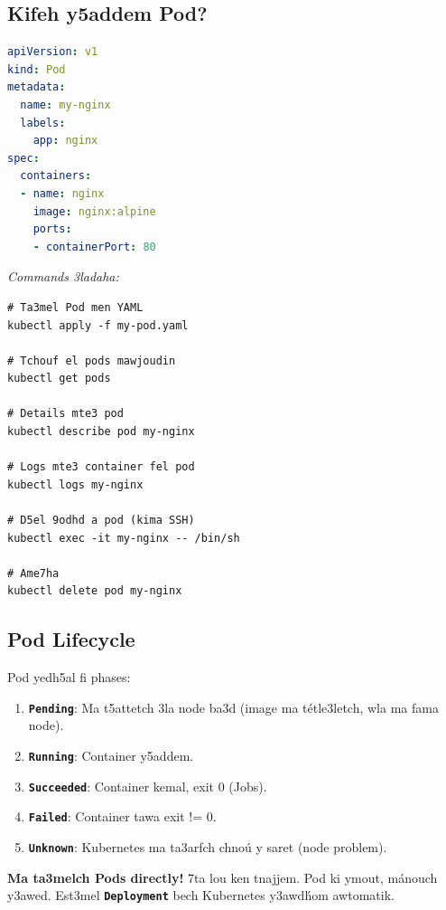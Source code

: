 \documentclass[11pt,a4paper]{book}
\newcommand{\tuni}[1]{\textit{\color{k8sdark}#1}}
\newcommand{\tech}[1]{\texttt{\color{k8sblue}\textbf{#1}}}
\begin{document}
\subsection{Kifeh y5addem Pod?}

\begin{lstlisting}[language=yaml,caption={Pod b\'essat}]
apiVersion: v1
kind: Pod
metadata:
  name: my-nginx
  labels:
    app: nginx
spec:
  containers:
  - name: nginx
    image: nginx:alpine
    ports:
    - containerPort: 80
\end{lstlisting}

\tuni{Commands 3ladaha:}
\begin{lstlisting}
# Ta3mel Pod men YAML
kubectl apply -f my-pod.yaml

# Tchouf el pods mawjoudin
kubectl get pods

# Details mte3 pod
kubectl describe pod my-nginx

# Logs mte3 container fel pod
kubectl logs my-nginx

# D5el 9odhd a pod (kima SSH)
kubectl exec -it my-nginx -- /bin/sh

# Ame7ha
kubectl delete pod my-nginx
\end{lstlisting}

\subsection{Pod Lifecycle}

Pod yedh5al fi phases:
\begin{enumerate}
  \item \tech{Pending}: Ma t5attetch 3la node ba3d (image ma t\'etle3letch, wla ma fama node).
  \item \tech{Running}: Container y5addem.
  \item \tech{Succeeded}: Container kemal, exit 0 (Jobs).
  \item \tech{Failed}: Container tawa exit != 0.
  \item \tech{Unknown}: Kubernetes ma ta3arfch chno\'u y saret (node problem).
\end{enumerate}

\begin{warnbox}
\textbf{Ma ta3melch Pods directly!} 7ta lou ken tnajjem. Pod ki ymout, m\'anouch y3awed. Est3mel \tech{Deployment} bech Kubernetes y3awd\'hom awtomatik.
\end{warnbox}

\end{document}
